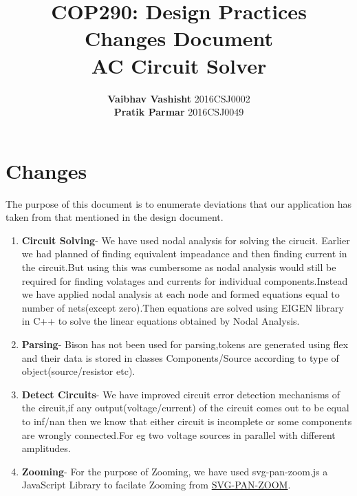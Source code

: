\documentclass[12pt]{extarticle}
\date{}
\author{\textbf{Vaibhav Vashisht} 2016CSJ0002  \\\textbf{Pratik Parmar} 2016CSJ0049}
\title{\textbf{COP290: Design Practices\\ Changes Document \\ AC Circuit Solver  }}
\begin{document}
\maketitle
\newpage


\section{Changes}


The purpose of this document is to enumerate deviations that our application has taken from that mentioned in the design document.

\begin{enumerate}
\item \textbf{Circuit Solving}- We have used nodal analysis for solving the cirucit. Earlier we had planned of finding equivalent impeadance and then finding current in the circuit.But using this  was cumbersome as nodal analysis would still be required for finding volatages and currents for individual components.Instead we have applied nodal analysis at each node and formed equations equal to number of nets(except zero).Then equations are solved using EIGEN library in C++ to solve the linear equations obtained by Nodal Analysis.
  
\item \textbf{Parsing}- Bison has not been used for parsing,tokens are generated using flex and their data is stored in classes Components/Source according to type of object(source/resistor etc).

\item \textbf{Detect Circuits}- We have improved circuit error detection mechanisms of the circuit,if any output(voltage/current) of the circuit comes out to be equal to inf/nan then we know that either circuit is incomplete or some components are wrongly connected.For eg two voltage sources in parallel with different amplitudes.

\item \textbf{Zooming}- For the purpose of Zooming, we have used svg-pan-zoom.js a JavaScript Library to facilate Zooming from \href{https://github.com/ariutta/svg-pan-zoom}{SVG-PAN-ZOOM}.  
  
\end{enumerate}
\end{document}
